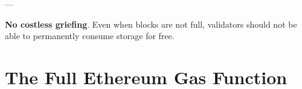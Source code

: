 \documentclass[12pt, final]{article}
\begin{document}
---


\textbf{No costless griefing}. Even when blocks are not full, validators should not be able to permanently consume storage for free.










\section{The Full Ethereum Gas Function}
\label{appendix:gasfunction}
\end{document}
